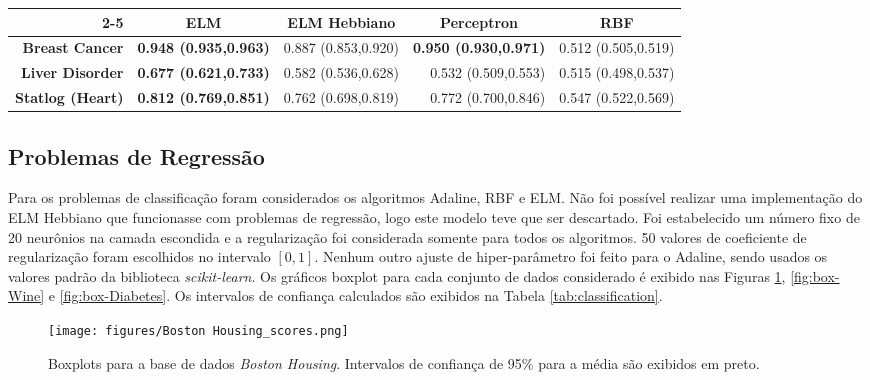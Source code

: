 \documentclass[conference]{IEEEtran}
\begin{document}
	\begin{table*}[thpbh]
		\caption{Intervalos de confiança de 95\% calculados para a AUC média}
		\label{tab:classification}
		\centering
		\begin{tabular}{r|r|r|r|r|}
			\cline{2-5}
			\multicolumn{1}{l|}{}                          & \multicolumn{1}{c|}{\textbf{ELM}} & \multicolumn{1}{c|}{\textbf{ELM Hebbiano}} & \multicolumn{1}{c|}{\textbf{Perceptron}} & \multicolumn{1}{c|}{\textbf{RBF}} \\ \hline
			\multicolumn{1}{|r|}{\textbf{Breast Cancer}}   & \textbf{0.948 (0.935,0.963)}         & 0.887 (0.853,0.920)                           & \textbf{0.950 (0.930,0.971)}                & 0.512 (0.505,0.519)                  \\ \hline
			\multicolumn{1}{|r|}{\textbf{Liver Disorder}}  & \textbf{0.677 (0.621,0.733)}         & 0.582 (0.536,0.628)                           & 0.532 (0.509,0.553)                         & 0.515 (0.498,0.537)                  \\ \hline
			\multicolumn{1}{|r|}{\textbf{Statlog (Heart)}} & \textbf{0.812 (0.769,0.851)}         & 0.762 (0.698,0.819)                           & 0.772 (0.700,0.846)                         & 0.547 (0.522,0.569)                  \\ \hline
		\end{tabular}
	\end{table*}

	\subsection{Problemas de Regressão}
	Para os problemas de classificação foram considerados os algoritmos Adaline, RBF e ELM. Não foi possível realizar uma implementação do ELM Hebbiano que funcionasse com problemas de regressão, logo este modelo teve que ser descartado. Foi estabelecido um número fixo de 20 neurônios na camada escondida e a regularização foi considerada somente para todos os algoritmos. 50 valores de coeficiente de regularização foram escolhidos no intervalo $[0,1]$. Nenhum outro ajuste de hiper-parâmetro foi feito para o Adaline, sendo usados os valores padrão da biblioteca \textit{scikit-learn}. Os gráficos boxplot para cada conjunto de dados considerado é exibido nas Figuras \ref{fig:box-Boston-Housing}, \ref{fig:box-Wine} e \ref{fig:box-Diabetes}.  Os intervalos de confiança calculados são exibidos na Tabela \ref{tab:classification}.

	\begin{figure}[thpbh]
		\centering
		\texttt{[image: figures/Boston Housing\_scores.png]}
		\caption{Boxplots para a base de dados \textit{Boston Housing}. Intervalos de confiança de 95\% para a média são exibidos em preto.}
		\label{fig:box-Boston-Housing}
	\end{figure}
	
\end{document}
